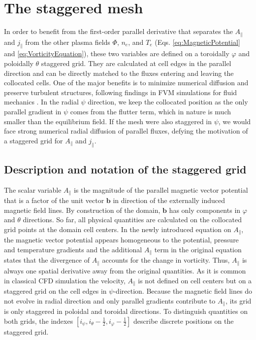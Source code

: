 \section{The staggered mesh}


In order to benefit from the first-order parallel derivative that separates the $A_\parallel$ and $j_\parallel$ from the other plasma fields $\Phi$, $n_e$, and $T_e$ (Eqs. \ref{eq:MagneticPotential} and \ref{eq:VorticityEquation}), these two variables are defined on a toroidally $\varphi$ and poloidally $\theta$ staggered grid. They are calculated at cell edges in the parallel direction and can be directly matched to the fluxes entering and leaving the collocated cells. One of the major benefits is to minimize numerical diffusion and preserve turbulent structures, following findings in FVM simulations for fluid mechanics \cite{meier1999comparison}. In the radial $\psi$ direction, we keep the collocated position as the only parallel gradient in $\psi$ comes from the flutter term, which in nature is much smaller than the equilibrium field. If the mesh were also staggered in $\psi$, we would face strong numerical radial diffusion of parallel fluxes, defying the motivation of a staggered grid for $A_\parallel$ and $j_\parallel$. \newline



\subsection{Description and notation of the staggered grid}
The scalar variable $A_\parallel$ is the magnitude of the parallel magnetic vector potential that is a factor of the unit vector $\mathbf{b}$ in direction of the externally induced magnetic field lines. By construction of the domain, $\mathbf{b}$ has only components in $\varphi$ and $\theta$ directions. So far, all physical quantities are calculated on the collocated grid points at the domain cell centers. In the newly introduced equation on $A_\parallel$, the magnetic vector potential appears homogeneous to the potential, pressure and temperature gradients and the additional $A_\parallel$ term in the original equation states that the divergence of $A_\parallel$ accounts for the change in vorticity. Thus, $A_\parallel$ is always one spatial derivative away from the original quantities. As it is common in classical CFD simulation the velocity, $A_\parallel$ is not defined on cell centers but on a staggered grid on the cell edges in $\psi$-direction. Because the magnetic field lines do not evolve in radial direction and only parallel gradients contribute to $A_\parallel$, its grid is only staggered in  poloidal and toroidal directions. To distinguish quantities on both grids, the indexes $[i_\psi, i_\theta - \frac{1}{2},i_\varphi-\frac{1}{2}]$ describe discrete positions on the staggered grid. \\

